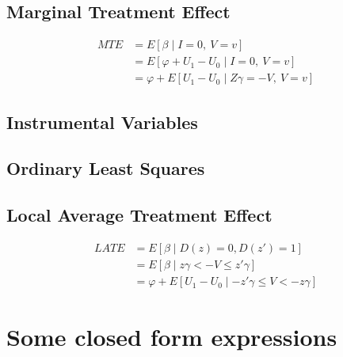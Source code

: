 \documentclass[9pt,twocolumn,twoside,]{pnas-new}
\begin{document}
\hypertarget{marginal-treatment-effect}{%
\subsection*{Marginal Treatment
Effect}\label{marginal-treatment-effect}}

\begin{align*}
MTE &= E \left[ \beta \mid I = 0,\ V = v \right] \\
&= E \left[ \varphi + U_1 - U_0 \mid I = 0,\ V = v \right] \\
&= \varphi + E \left[ U_1 - U_0 \mid Z \gamma = - V,\ V = v \right]
\end{align*}

\hypertarget{instrumental-variables}{%
\subsection*{Instrumental Variables}\label{instrumental-variables}}

\hypertarget{ordinary-least-squares}{%
\subsection*{Ordinary Least Squares}\label{ordinary-least-squares}}

\hypertarget{local-average-treatment-effect}{%
\subsection*{Local Average Treatment
Effect}\label{local-average-treatment-effect}}

\begin{align*}
LATE &= E \left[ \beta \mid D(z) = 0, D(z') = 1 \right] \\
&= E \left[ \beta \mid z \gamma < - V \leq z' \gamma \right] \\
&= \varphi + E \left[ U_1 - U_0 \mid - z' \gamma \leq V < - z \gamma \right]
\end{align*}

\hypertarget{some-closed-form-expressions}{%
\section{Some closed form
expressions}\label{some-closed-form-expressions}}
\end{document}
